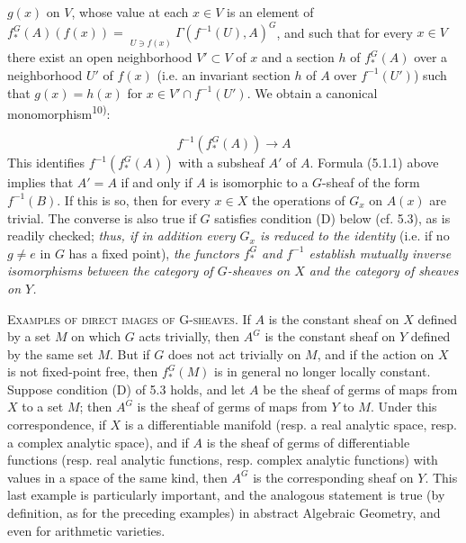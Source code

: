 \clearpage
{}

$g(x)$ on $V$, whose value at each $x\in V$ is an element of $f_*^G(A)(f(x))=\mathop{\underset{\to}{\mathrm{lim.}}}\limits_{U\ni f(x)}\Gamma(f^{-1}(U),A)^G$,
and such that for every $x\in V$ there exist an open neighborhood
$V'\subset V$ of $x$ and a section $h$ of $f_*^G(A)$ over a neighborhood
$U'$ of $f(x)$ (i.e. an invariant section $h$ of $A$ over $f^{-1}(U')$) such
that $g(x)=h(x)$ for $x\in V'\cap f^{-1}(U')$. We obtain a canonical
monomorphism\textsuperscript{10)}:

\[
f^{-1}(f_*^G(A))\to A
\tag{5.1.2}
\]
This identifies $f^{-1}(f_*^G(A))$ with a subsheaf $A'$ of $A$. Formula
(5.1.1) above implies that $A'=A$ if and only if $A$ is isomorphic to a
$G$-sheaf of the form $f^{-1}(B)$. If this is so, then for every $x\in X$ the
operations of $G_x$ on $A(x)$ are trivial. The converse is also true if $G$
satisfies condition (D) below (cf. 5.3), as is readily checked;
\textit{thus, if in addition every $G_x$ is reduced to the identity} (i.e. if
no $g\ne e$ in $G$ has a fixed point), \textit{the functors $f_*^G$ and
$f^{-1}$ establish mutually inverse isomorphisms between the category of
$G$-sheaves on $X$ and the category of sheaves on $Y$.}

\textsc{Examples of direct images of G-sheaves.} If $A$ is the
constant sheaf on $X$ defined by a set $M$ on which $G$ acts trivially, then
$A^G$ is the constant sheaf on $Y$ defined by the same set $M$. But if $G$
does not act trivially on $M$, and if the action on $X$ is not fixed-point
free, then $f_*^G(M)$ is in general no longer locally constant.
Suppose condition (D) of 5.3 holds, and let $A$ be the sheaf of germs of maps
from $X$ to a set $M$; then $A^G$ is the sheaf of germs of maps from $Y$ to
$M$. Under this correspondence, if $X$ is a differentiable manifold (resp. a
real analytic space, resp. a complex analytic space), and if $A$ is the sheaf
of germs of differentiable functions (resp. real analytic functions, resp.
complex analytic functions) with values in a space of the same kind, then
$A^G$ is the corresponding sheaf on $Y$. This last example is particularly
important, and the analogous statement is true (by definition, as for the
preceding examples) in abstract Algebraic Geometry, and even for arithmetic
varieties.

